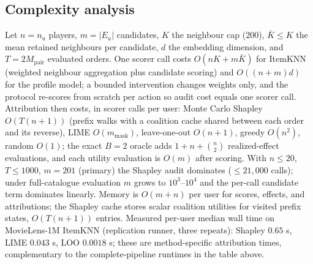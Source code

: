 \subsection*{Complexity analysis}
Let $n=n_u$ players, $m=|E_u|$ candidates, $K$ the neighbour cap ($200$), $\bar K\le K$ the mean retained neighbours per candidate, $d$ the embedding dimension, and $T=2M_{\mathrm{pair}}$ evaluated orders. One scorer call costs $O(nK+m\bar K)$ for ItemKNN (weighted neighbour aggregation plus candidate scoring) and $O((n+m)d)$ for the profile model; a bounded intervention changes weights only, and the protocol re-scores from scratch per action so audit cost equals one scorer call. Attribution then costs, in scorer calls per user: Monte Carlo Shapley $O(T(n+1))$ (prefix walks with a coalition cache shared between each order and its reverse), LIME $O(m_{\mathrm{mask}})$, leave-one-out $O(n+1)$, greedy $O(n^2)$, random $O(1)$; the exact $B=2$ oracle adds $1+n+\binom n2$ realized-effect evaluations, and each utility evaluation is $O(m)$ after scoring. With $n\le20$, $T\le1000$, $m=201$ (primary) the Shapley audit dominates ($\le21{,}000$ calls); under full-catalogue evaluation $m$ grows to $10^3$--$10^4$ and the per-call candidate term dominates linearly. Memory is $O(m+n)$ per user for scores, effects, and attributions; the Shapley cache stores scalar coalition utilities for visited prefix states, $O(T(n+1))$ entries. Measured per-user median wall time on MovieLens-1M ItemKNN (replication runner, three repeats): Shapley $0.65$ s, LIME $0.043$ s, LOO $0.0018$ s; these are method-specific attribution times, complementary to the complete-pipeline runtimes in the table above.
